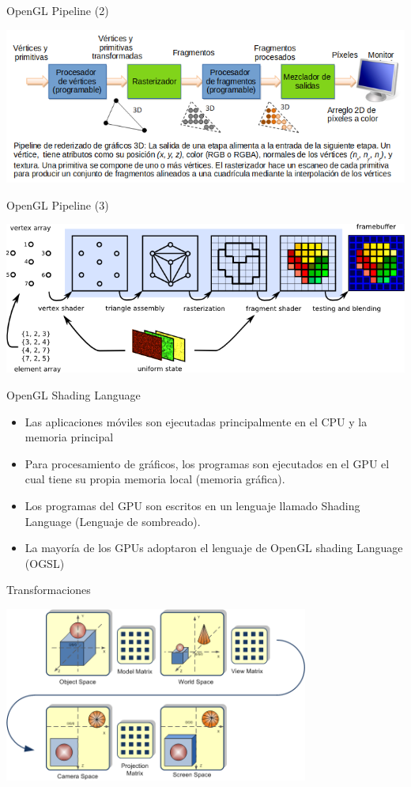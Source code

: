 \documentclass[pdf,
serif,
compress,
xcolor=table,
dvipsnames,
spanish,
aspectratio=169]{beamer}
\begin{document}
\begin{frame}{OpenGL Pipeline (2)}
    \begin{center}
    \includegraphics[width=\textwidth]{FigsOpenGL/OpenGL_Pipeline_Espaniol.png}
    \end{center}
\end{frame}


\begin{frame}{OpenGL Pipeline (3)}
    \begin{center}
    \includegraphics[width=\textwidth]{FigsOpenGL/evasgl-graphics-pipeline}
    \end{center}
\end{frame}

\begin{frame}{OpenGL Shading Language}
\begin{itemize}
\item Las aplicaciones móviles son ejecutadas principalmente en el CPU y la memoria principal
\item Para procesamiento de gráficos, los programas son ejecutados en el GPU el cual tiene su propia memoria local (memoria gráfica).
\item Los programas del GPU son escritos en un lenguaje llamado Shading Language (Lenguaje de sombreado). 
\item La mayoría de los GPUs adoptaron el lenguaje de OpenGL shading Language (OGSL)
\end{itemize}
\end{frame}

\begin{frame}{Transformaciones}
    \begin{center}
    \includegraphics[width=0.75\textwidth]{FigsOpenGL/ModelViewProjection_MVP_Matrix}
    \end{center}
\end{frame}
\end{document}
